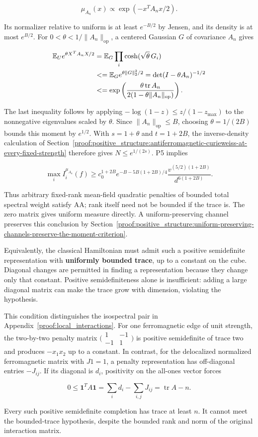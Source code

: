 \[
\mu_{A_n}(x)\propto \exp(-x^TA_nx/2).
\]

Its normalizer relative to uniform is at least \(e^{-B/2}\) by Jensen,
and its density is at most \(e^{B/2}\). For
\(0<\theta <1/\lVert A_n\rVert_{\mathrm{op}}\), a centered Gaussian
\(G\) of covariance \(A_n\) gives

\[
\begin{aligned}
\mathbb{E}_Ue^{\theta X^TA_nX/2}
&=\mathbb{E}_G\prod_i\cosh(\sqrt\theta\,G_i)\\
&\le \mathbb{E}_Ge^{\theta\|G\|_2^2/2}
=\det(I-\theta A_n)^{-1/2}\\
&\le\exp\left(\frac{\theta\operatorname{tr}A_n}
{2(1-\theta\|A_n\|_{\rm op})}\right).
\end{aligned}
\]

The last inequality follows by applying \(-\log (1-z)\le z/(1-z_{\max} )\)
to the nonnegative eigenvalues scaled by \(\theta\). Since
\(\lVert A_n\rVert_{\mathrm{op}}\le B\), choosing \(\theta =1/(2B)\)
bounds this moment by \(e^{1/2}\). With \(s=1+\theta\) and \(t=1+2B\),
the inverse-density calculation of Section~\ref{proof:positive_structure:antiferromagnetic-curieweiss-at-every-fixed-strength} therefore gives
\(N\le e^{1/(2s)}\). P5 implies

\[
\boxed{\max_i I_i^{\mu_{A_n}}(f)
\ge c_0^{1+2B}e^{-B-5B(1+2B)/4}
\frac{v^{(5/2)(1+2B)}}{d^{6(1+2B)}}.}
\tag{5.3}
\]

Thus arbitrary fixed-rank mean-field quadratic penalties of bounded
total spectral weight satisfy AA; rank itself need not be bounded if the
trace is. The zero matrix gives uniform measure directly. A
uniform-preserving channel preserves this conclusion by Section~\ref{proof:positive_structure:uniform-preserving-channels-preserve-the-moment-criterion}.

Equivalently, the classical Hamiltonian must admit such a positive
semidefinite representation with \textbf{uniformly bounded trace}, up to
a constant on the cube. Diagonal changes are permitted in finding a
representation because they change only that constant. Positive
semidefiniteness alone is insufficient: adding a large diagonal matrix
can make the trace grow with dimension, violating the hypothesis.

This condition distinguishes the isospectral pair in
Appendix~\ref{proof:local_interactions}. For one ferromagnetic edge of unit
strength, the two-by-two penalty matrix
\(\bigl(\begin{smallmatrix}1&-1\\-1&1\end{smallmatrix}\bigr)\) is
positive semidefinite of trace two and produces \(-x_1x_2\) up to a
constant. In contrast, for the delocalized normalized ferromagnetic
matrix with \(J 1=1\), a penalty representation has off-diagonal entries
\(-J_{ij}\). If its diagonal is \(d_i\), positivity on the all-ones vector
forces

\[
0\le\mathbf1^TA\mathbf1=\sum_i d_i-\sum_{i,j}J_{ij}
=\operatorname{tr}A-n.
\]

Every such positive semidefinite completion has trace at least \(n\). It
cannot meet the bounded-trace hypothesis, despite the bounded rank and
norm of the original interaction matrix.
